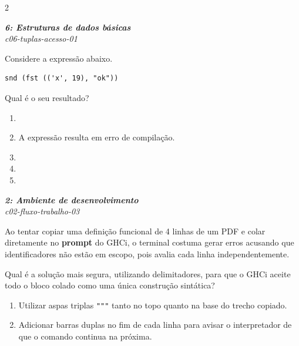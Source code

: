 \documentclass[a4paper,10pt,brazil]{article}
\begin{document}
\begin{multicols}{2}
\begin{flushright}
  \footnotesize
  \textit{\textbf{6: Estruturas de dados básicas}}\\
  \textit{c06-tuplas-acesso-01}\\

\end{flushright}
Considere a expressão abaixo.
\begin{verbatim}
snd (fst (('x', 19), "ok"))
\end{verbatim}
Qual é o seu resultado?

\begin{enumerate}
  \item {}

  \item A expressão resulta em erro de compilação.

  \item {}

  \item {}

  \item {}


\end{enumerate}

\begin{flushright}
  \footnotesize
  \textit{\textbf{2: Ambiente de desenvolvimento}}\\
  \textit{c02-fluxo-trabalho-03}\\

\end{flushright}
Ao tentar copiar uma definição funcional de 4 linhas de um PDF e colar diretamente no \textbf{prompt} do GHCi, o terminal costuma gerar erros acusando que identificadores não estão em escopo, pois avalia cada linha independentemente. 

Qual é a solução mais segura, utilizando delimitadores, para que o GHCi aceite todo o bloco colado como uma única construção sintática?

\begin{enumerate}
  \item Utilizar aspas triplas \texttt{"""} tanto no topo quanto na base do trecho copiado.

  \item Adicionar barras duplas \haskellinline{//} no fim de cada linha para avisar o interpretador de que o comando continua na próxima.


\end{enumerate}
\end{multicols}
\end{document}
